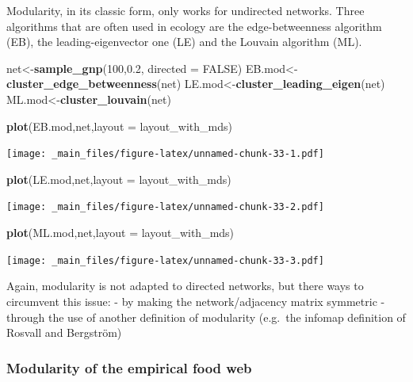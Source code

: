 \documentclass[
]{book}
\newenvironment{Shaded}{\begin{snugshade}}{\end{snugshade}}
\newcommand{\AttributeTok}[1]{\textcolor[rgb]{0.13,0.29,0.53}{#1}}
\newcommand{\ConstantTok}[1]{\textcolor[rgb]{0.56,0.35,0.01}{#1}}
\newcommand{\DecValTok}[1]{\textcolor[rgb]{0.00,0.00,0.81}{#1}}
\newcommand{\FloatTok}[1]{\textcolor[rgb]{0.00,0.00,0.81}{#1}}
\newcommand{\FunctionTok}[1]{\textcolor[rgb]{0.13,0.29,0.53}{\textbf{#1}}}
\newcommand{\NormalTok}[1]{#1}
\newcommand{\OtherTok}[1]{\textcolor[rgb]{0.56,0.35,0.01}{#1}}
\theoremstyle{definition}
\theoremstyle{definition}
\theoremstyle{definition}
\theoremstyle{definition}
\theoremstyle{remark}
\begin{document}
Modularity, in its classic form, only works for undirected networks.
Three algorithms that are often used in ecology are the edge-betweenness algorithm (EB), the leading-eigenvector one (LE) and the Louvain algorithm (ML).

\begin{Shaded}
\begin{Highlighting}[]
\NormalTok{net}\OtherTok{\textless{}{-}}\FunctionTok{sample\_gnp}\NormalTok{(}\DecValTok{100}\NormalTok{,}\FloatTok{0.2}\NormalTok{, }\AttributeTok{directed =} \ConstantTok{FALSE}\NormalTok{)}
\NormalTok{EB.mod}\OtherTok{\textless{}{-}}\FunctionTok{cluster\_edge\_betweenness}\NormalTok{(net)}
\NormalTok{LE.mod}\OtherTok{\textless{}{-}}\FunctionTok{cluster\_leading\_eigen}\NormalTok{(net)}
\NormalTok{ML.mod}\OtherTok{\textless{}{-}}\FunctionTok{cluster\_louvain}\NormalTok{(net)}

\FunctionTok{plot}\NormalTok{(EB.mod,net,}\AttributeTok{layout =}\NormalTok{ layout\_with\_mds)}
\end{Highlighting}
\end{Shaded}

\texttt{[image: \_main\_files/figure-latex/unnamed-chunk-33-1.pdf]}

\begin{Shaded}
\begin{Highlighting}[]
\FunctionTok{plot}\NormalTok{(LE.mod,net,}\AttributeTok{layout =}\NormalTok{ layout\_with\_mds)}
\end{Highlighting}
\end{Shaded}

\texttt{[image: \_main\_files/figure-latex/unnamed-chunk-33-2.pdf]}

\begin{Shaded}
\begin{Highlighting}[]
\FunctionTok{plot}\NormalTok{(ML.mod,net,}\AttributeTok{layout =}\NormalTok{ layout\_with\_mds)}
\end{Highlighting}
\end{Shaded}

\texttt{[image: \_main\_files/figure-latex/unnamed-chunk-33-3.pdf]}

Again, modularity is not adapted to directed networks, but there ways to circumvent this issue:
- by making the network/adjacency matrix symmetric
- through the use of another definition of modularity (e.g.~the infomap definition of Rosvall and Bergström)

\subsubsection{Modularity of the empirical food web}\label{modularity-of-the-empirical-food-web}
\end{document}
